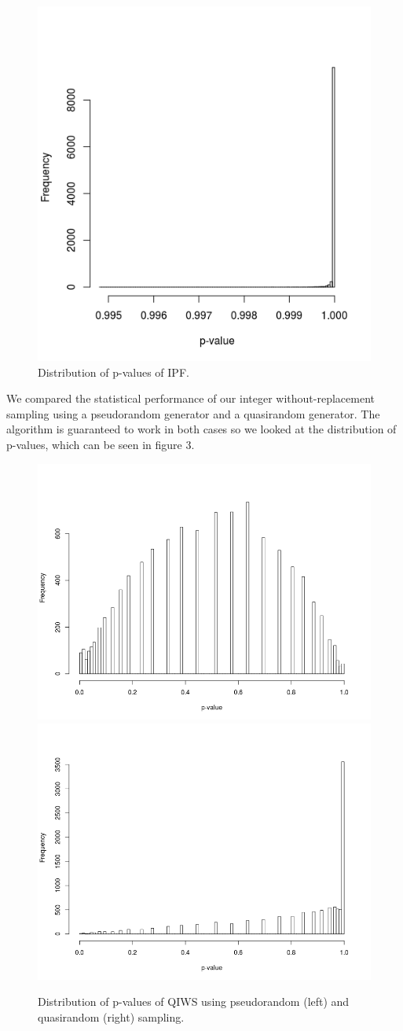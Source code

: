 \documentclass[]{article}
\begin{document}
\begin{figure}[H]

{\centering \includegraphics[width=0.5\linewidth]{figures/ipf_pvalue_dist} 

}

\caption{Distribution of p-values of IPF.}\label{fig:unnamed-chunk-3}
\end{figure}

We compared the statistical performance of our integer without-replacement sampling using a pseudorandom
generator and a quasirandom generator. The algorithm is guaranteed to
work in both cases so we looked at the distribution of p-values, which
can be seen in figure 3.

\begin{figure}[H]
\includegraphics[width=0.5\linewidth]{figures/iqws_prng_pvalue_dist} \includegraphics[width=0.5\linewidth]{figures/iqws_pvalue_dist} \caption{Distribution of p-values of QIWS using pseudorandom (left) and quasirandom (right) sampling.}\label{fig:unnamed-chunk-4}
\end{figure}
\end{document}
